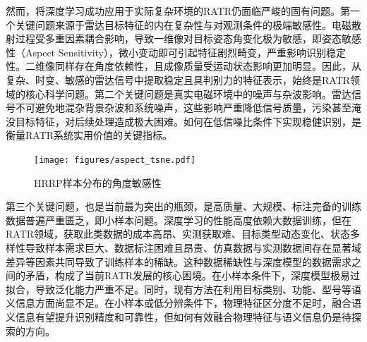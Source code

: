 然而，将深度学习成功应用于实际复杂环境的RATR仍面临严峻的固有问题。第一个关键问题来源于雷达目标特征的内在复杂性与对观测条件的极端敏感性。电磁散射过程受多重因素耦合影响，导致一维像对目标姿态角变化极为敏感，即姿态敏感性（Aspect Sensitivity），微小变动即可引起特征剧烈畸变，严重影响识别稳定性。二维像同样存在角度依赖性，且成像质量受运动状态影响更加明显。因此，从复杂、时变、敏感的雷达信号中提取稳定且具判别力的特征表示，始终是RATR领域的核心科学问题。第二个关键问题是真实电磁环境中的噪声与杂波影响。雷达信号不可避免地混杂背景杂波和系统噪声，这些影响严重降低信号质量，污染甚至淹没目标特征，对后续处理造成极大困难。如何在低信噪比条件下实现稳健识别，是衡量RATR系统实用价值的关键指标。

\begin{figure}[h]
    \centering
    \texttt{[image: figures/aspect\_tsne.pdf]}
    \caption{HRRP样本分布的角度敏感性}
    \label{fig:hrrp_angle_sensitivity}
\end{figure}


第三个关键问题，也是当前最为突出的瓶颈，是高质量、大规模、标注完备的训练数据普遍严重匮乏，即小样本问题。深度学习的性能高度依赖大数据训练，但在RATR领域，获取此类数据的成本高昂、实测获取难、目标类型动态变化、状态多样性导致样本需求巨大、数据标注困难且昂贵、仿真数据与实测数据间存在显著域差异等因素共同导致了训练样本的稀缺。这种数据稀缺性与深度模型的数据需求之间的矛盾，构成了当前RATR发展的核心困境。在小样本条件下，深度模型极易过拟合，导致泛化能力严重不足。同时，现有方法在利用目标类别、功能、型号等语义信息方面尚显不足。在小样本或低分辨条件下，物理特征区分度不足时，融合语义信息有望提升识别精度和可靠性，但如何有效融合物理特征与语义信息仍是待探索的方向。

